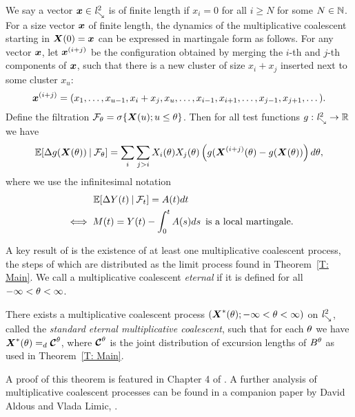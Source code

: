 We say a vector $\boldsymbol{x} \in \mathit{l}^2_{\searrow}$ is of finite length if $x_i = 0$ for all $i \geq N$ for some $N \in \mathbb{N}$.
For a size vector $\boldsymbol{x}$ of finite length,
the dynamics of the multiplicative coalescent starting in $\boldsymbol{X}(0) = \boldsymbol{x}$ can be expressed in martingale form as follows.
For any vector $\boldsymbol{x}$, let $\boldsymbol{x}^{(i+j)}$ be the configuration obtained by merging the $i$-th and $j$-th components of $\boldsymbol{x}$,
such that there is a new cluster of size $x_i + x_j$ inserted next to some cluster $x_u$:
\begin{equation}
	\boldsymbol{x}^{(i+j)} = (x_1, \dots, x_{u-1}, x_i + x_j, x_u, \dots, x_{i-1}, x_{i+1}, \dots, x_{j-1}, x_{j+1}, \dots).
\end{equation}
Define the filtration $\mathcal{F}_{\theta} = \sigma\{ \boldsymbol{X}(u); u \leq \theta \}$.
Then for all test functions $g: \mathit{l}^2_{\searrow} \rightarrow \mathbb{R}$ we have
\begin{equation}
	\mathbb{E}[\Delta g(\boldsymbol{X}(\theta)) \: | \: \mathcal{F}_{\theta}]
	= \sum_i \sum_{j > i} X_i(\theta) X_j(\theta) \left( g(\boldsymbol{X}^{(i+j)}(\theta) - g(\boldsymbol{X}(\theta)) \right)d\theta,
\end{equation}
where we use the infinitesimal notation
\begin{equation}
\begin{aligned}
	&\qquad \quad \mathbb{E}[\Delta Y(t) \: | \: \mathcal{F}_{t}] = A(t)dt \\ 
	&\iff M(t) = Y(t) - \int_{0}^{t}A(s)ds \enspace \text{is a local martingale.}
\end{aligned}
\end{equation}

A key result of \cite{Aldous.1997} is the existence of at least one multiplicative coalescent process, 
the steps of which are distributed as the limit process found in Theorem~\ref{T: Main}.
We call a multiplicative coalescent \emph{eternal} if it is defined for all $-\infty < \theta < \infty$.

\begin{theorem}
	There exists a multiplicative coalescent process
	$ (\boldsymbol{X}^*(\theta); -\infty < \theta < \infty)$ on $\mathit{l}^2_{\searrow}$,
	called the \emph{standard eternal multiplicative coalescent},
	such that for each $\theta$ we have $\boldsymbol{X}^*(\theta) =_d \boldsymbol{\mathcal{C}}^{\theta}$,
	where $\boldsymbol{\mathcal{C}}^{\theta}$ is the joint distribution of excursion lengths of $B^{\theta}$ as used in Theorem~\ref{T: Main}.
\end{theorem}

A proof of this theorem is featured in Chapter 4 of \cite{Aldous.1998}.
A further analysis of multiplicative coalescent processes can be found in a companion paper by David Aldous and Vlada Limic, \cite{Aldous.1998}.





